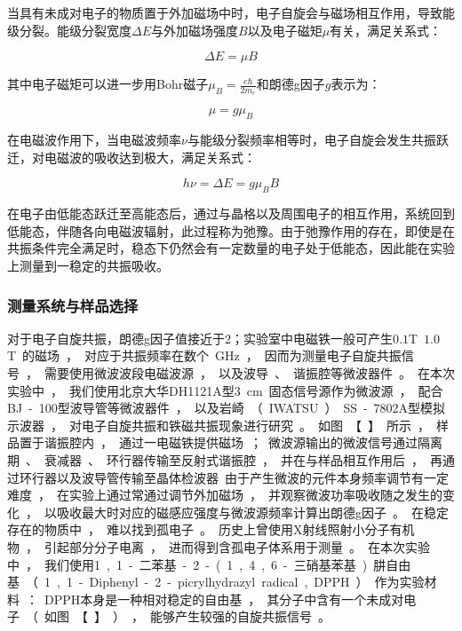\documentclass{thuemp}
\begin{document}
当具有未成对电子的物质置于外加磁场中时，电子自旋会与磁场相互作用，导致能级分裂。能级分裂宽度$\Delta E$与外加磁场强度$B$以及电子磁矩$\mu$有关，满足关系式：

\begin{equation}
\Delta E = \mu B
\end{equation}

其中电子磁矩可以进一步用Bohr磁子$\mu_B = \frac{e\hbar}{2m_e}$和朗德g因子$g$表示为：

\begin{equation}
\mu = g \mu_B
\end{equation}

在电磁波作用下，当电磁波频率$\nu$与能级分裂频率相等时，电子自旋会发生共振跃迁，对电磁波的吸收达到极大，满足关系式：

\begin{equation}
h \nu  = \Delta E = g \mu_B B
\end{equation}

在电子由低能态跃迁至高能态后，通过与晶格以及周围电子的相互作用，系统回到低能态，伴随各向电磁波辐射，此过程称为弛豫。由于弛豫作用的存在，即使是在共振条件完全满足时，稳态下仍然会有一定数量的电子处于低能态，因此能在实验上测量到一稳定的共振吸收。

\subsubsection{测量系统与样品选择}

对于电子自旋共振，朗德g因子值接近于2；实验室中电磁铁一般可产生$0.1$\si{\tesla}~$1.0$\si\tesla 的磁场，对应于共振频率在数个\si{\giga\hertz}，因而为测量电子自旋共振信号，需要使用微波波段电磁波源，以及波导、谐振腔等微波器件。

在本次实验中，我们使用北京大华DH1121A型3\si{\centi\meter}固态信号源作为微波源，配合BJ-100型波导管等微波器件，以及岩崎（IWATSU）SS-7802A型模拟示波器，对电子自旋共振和铁磁共振现象进行研究。如图【】所示，样品置于谐振腔内，通过一电磁铁提供磁场；微波源输出的微波信号通过隔离期、衰减器、环行器传输至反射式谐振腔，并在与样品相互作用后，再通过环行器以及波导管传输至晶体检波器

由于产生微波的元件本身频率调节有一定难度，在实验上通过常通过调节外加磁场，并观察微波功率吸收随之发生的变化，以吸收最大时对应的磁感应强度与微波源频率计算出朗德g因子。

在稳定存在的物质中，难以找到孤电子。历史上曾使用X射线照射小分子有机物，引起部分分子电离，进而得到含孤电子体系用于测量。在本次实验中，我们使用1,1-二苯基-2-(1,4,6-三硝基苯基)肼自由基（1,1-Diphenyl-2-picrylhydrazyl radical, DPPH）作为实验材料：DPPH本身是一种相对稳定的自由基，其分子中含有一个未成对电子（如图【】），能够产生较强的自旋共振信号。
\end{document}
